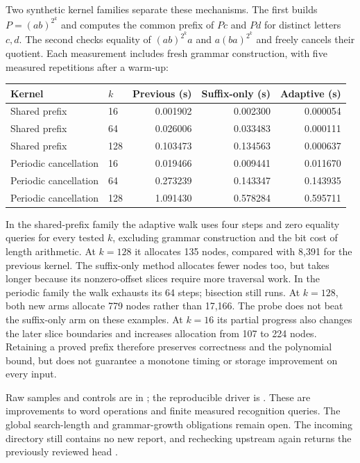 Two synthetic kernel families separate these mechanisms. The first builds
$P=(ab)^{2^k}$ and computes the common prefix of $Pc$ and $Pd$ for distinct
letters $c,d$. The second checks equality of $(ab)^{2^k}a$ and
$a(ba)^{2^k}$ and freely cancels their quotient. Each measurement includes
fresh grammar construction, with five measured repetitions after a warm-up:
\begin{center}
\begin{tabular}{llrrr}
\toprule
Kernel & $k$ & Previous (s) & Suffix-only (s) & Adaptive (s)\\
\midrule
Shared prefix & 16 & 0.001902 & 0.002300 & 0.000054\\
Shared prefix & 64 & 0.026006 & 0.033483 & 0.000111\\
Shared prefix & 128 & 0.103473 & 0.134563 & 0.000637\\
Periodic cancellation & 16 & 0.019466 & 0.009441 & 0.011670\\
Periodic cancellation & 64 & 0.273239 & 0.143347 & 0.143935\\
Periodic cancellation & 128 & 1.091430 & 0.578284 & 0.595711\\
\bottomrule
\end{tabular}
\end{center}
In the shared-prefix family the adaptive walk uses four steps and zero
equality queries for every tested $k$, excluding grammar construction and
the bit cost of length arithmetic. At $k=128$ it allocates 135 nodes,
compared with 8,391 for the previous kernel. The suffix-only method
allocates fewer nodes too, but takes longer because its nonzero-offset
slices require more traversal work. In the periodic family the walk
exhausts its 64 steps; bisection still runs. At $k=128$, both new arms
allocate 779 nodes rather than 17,166. The probe does not beat the
suffix-only arm on these examples. At $k=16$ its partial progress also
changes the later slice boundaries and increases allocation from 107 to
224 nodes. Retaining a proved prefix therefore preserves correctness and
the polynomial bound, but does not guarantee a monotone timing or storage
improvement on every input.

Raw samples and controls are in
; the reproducible driver
is . These are improvements to
word operations and finite measured recognition queries. The global
search-length and grammar-growth obligations remain open. The incoming
directory still contains no new report, and rechecking upstream
 again returns the previously reviewed head
.


